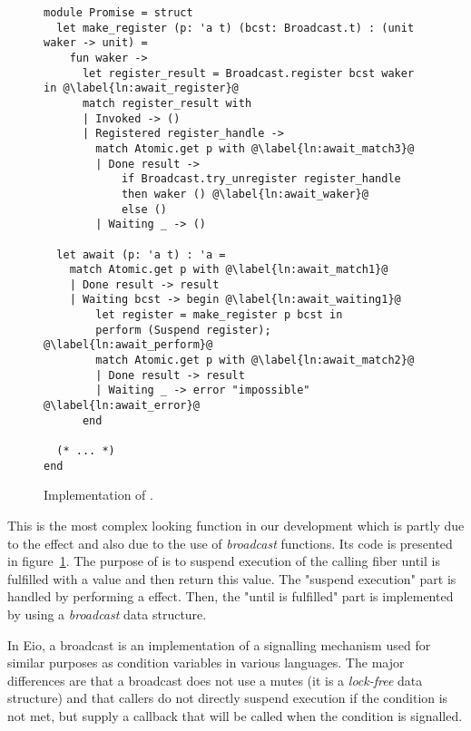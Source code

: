 \begin{figure}[ht]
  \begin{verbatim}
module Promise = struct
  let make_register (p: 'a t) (bcst: Broadcast.t) : (unit waker -> unit) =
    fun waker ->
      let register_result = Broadcast.register bcst waker in @\label{ln:await_register}@
      match register_result with
      | Invoked -> ()
      | Registered register_handle ->
        match Atomic.get p with @\label{ln:await_match3}@
        | Done result ->  
            if Broadcast.try_unregister register_handle
            then waker () @\label{ln:await_waker}@
            else ()
        | Waiting _ -> ()

  let await (p: 'a t) : 'a =
    match Atomic.get p with @\label{ln:await_match1}@
    | Done result -> result
    | Waiting bcst -> begin @\label{ln:await_waiting1}@
        let register = make_register p bcst in
        perform (Suspend register); @\label{ln:await_perform}@
        match Atomic.get p with @\label{ln:await_match2}@
        | Done result -> result 
        | Waiting _ -> error "impossible" @\label{ln:await_error}@
      end
    
  (* ... *)
end
  \end{verbatim}
  \caption{Implementation of .}
  \label{fig:sched-impl-await}
\end{figure}

This is the most complex looking function in our development which is partly due to the \esuspend{} effect and also due to the use of \emph{broadcast} functions.
Its code is presented in figure~\ref{fig:sched-impl-await}.
The purpose of  is to suspend execution of the calling fiber until  is fulfilled with a value and then return this value.
The "suspend execution" part is handled by performing a \esuspend{} effect.
Then, the "until  is fulfilled" part is implemented by using a \emph{broadcast} data structure.

In Eio, a broadcast is an implementation of a signalling mechanism used for similar purposes as condition variables in various languages.
The major differences are that a broadcast does not use a mutes (it is a \emph{lock-free} data structure) and that callers do not directly suspend execution if the condition is not met, but supply a callback that will be called when the condition is signalled.

